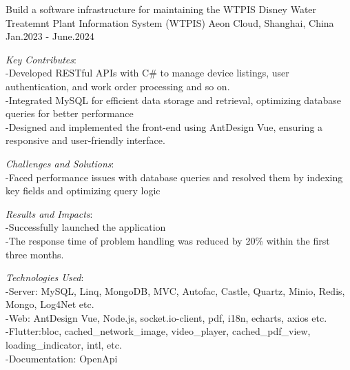 \begin{cventries}
  \cventry
    {Build a software infrastructure for maintaining the WTPIS} %
    {Disney Water Treatemnt Plant Information System  (WTPIS)} %
    {Aeon Cloud, Shanghai, China} %
    {Jan.2023 - June.2024} %
    {
      \begin{cvitems} %
        \item {\textit{Key Contributes}: \\
        -Developed RESTful APIs with C\#  to manage device listings, user authentication, and work order processing and so on. 
        \\-Integrated MySQL for efficient data storage and retrieval, optimizing database queries for better performance}
        \\ -Designed and implemented the front-end using AntDesign Vue, ensuring a responsive and user-friendly interface. 
        \item {\textit{Challenges and Solutions}: \\-Faced performance issues with database queries and resolved them by indexing key fields and optimizing query logic }
        \item {\textit{Results and Impacts}: \\-Successfully launched the application \\-The response time of problem handling was reduced by 20\% within the first three months.}
        \item {\textit{Technologies Used}: \\ -Server: MySQL, Linq, MongoDB, MVC,  Autofac, Castle, Quartz, Minio, Redis, Mongo, Log4Net etc. \\-Web: AntDesign Vue, Node.js, socket.io-client, pdf, i18n, echarts, axios etc. \\-Flutter:bloc, cached\_network\_image, video\_player, cached\_pdf\_view, loading\_indicator, intl, etc. \\ -Documentation: OpenApi}        

\end{cvitems}}
\end{cventries}
